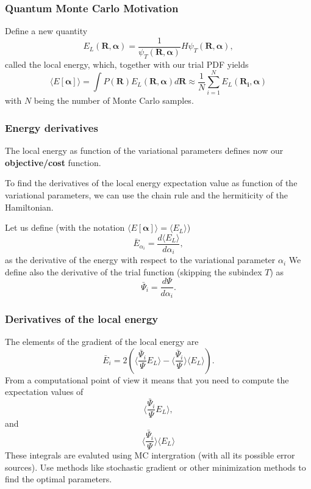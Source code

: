 \documentclass{beamer}
\begin{document}
\begin{frame}
\frametitle{Quantum Monte Carlo Motivation}

\begin{block}{Define a new quantity }
\[
   E_L(\bm{R},\bm{\alpha})=\frac{1}{\psi_T(\bm{R},\bm{\alpha})}H\psi_T(\bm{R},\bm{\alpha}),
\]
called the local energy, which, together with our trial PDF yields
\[
  \langle E[\bm{\alpha}] \rangle=\int P(\bm{R})E_L(\bm{R},\bm{\alpha}) d\bm{R}\approx \frac{1}{N}\sum_{i=1}^NE_L(\bm{R_i},\bm{\alpha})
\]
with $N$ being the number of Monte Carlo samples.
\end{block}
\end{frame}

\begin{frame}
\frametitle{Energy derivatives}

\begin{block}{}
The local energy as function of the variational parameters defines now our \textbf{objective/cost} function.

To find the derivatives of the local energy expectation value as function of the variational parameters, we can use the chain rule and the hermiticity of the Hamiltonian.  

Let us define (with the notation $\langle E[\bm{\alpha}]\rangle =\langle  E_L\rangle$)
\[
\bar{E}_{\alpha_i}=\frac{d\langle  E_L\rangle}{d\alpha_i},
\]
as the derivative of the energy with respect to the variational parameter $\alpha_i$
We define also the derivative of the trial function (skipping the subindex $T$) as 
\[
\bar{\Psi}_{i}=\frac{d\Psi}{d\alpha_i}.
\]
\end{block}
\end{frame}

\begin{frame}
\frametitle{Derivatives of the local energy}

\begin{block}{}
The elements of the gradient of the local energy are 
\[
\bar{E}_{i}= 2\left( \langle \frac{\bar{\Psi}_{i}}{\Psi}E_L\rangle -\langle \frac{\bar{\Psi}_{i}}{\Psi}\rangle\langle E_L \rangle\right).
\]
From a computational point of view it means that you need to compute the expectation values of 
\[
\langle \frac{\bar{\Psi}_{i}}{\Psi}E_L\rangle,
\]
and
\[
\langle \frac{\bar{\Psi}_{i}}{\Psi}\rangle\langle E_L\rangle
\]
These integrals are evaluted using MC intergration (with all its possible error sources). Use methods like stochastic gradient or other minimization methods to find the optimal parameters.
\end{block}
\end{frame}
\end{document}
